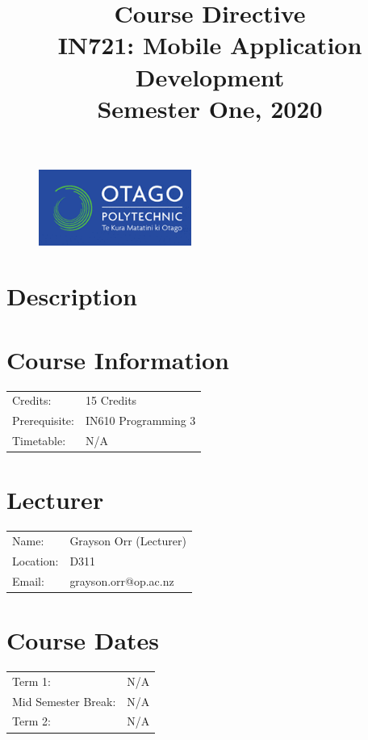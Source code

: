 \documentclass{article}
\author{}
\begin{document}
\begin{figure}
  \includegraphics[width=50mm]{../../resources/img/logo.png}
\end{figure}

\title{Course Directive\\IN721: Mobile Application Development\\Semester One, 2020}
\date{}
\maketitle

\section*{Description}

\section*{Course Information}
\begin{tabular}{ll}
  Credits:      & 15 Credits          \\
  Prerequisite: & IN610 Programming 3 \\
  Timetable:    & N/A                 \\
\end{tabular}

\section*{Lecturer}
\begin{tabular}{ll}
  Name:     & Grayson Orr (Lecturer) \\
  Location: & D311                   \\
  Email:    & grayson.orr@op.ac.nz   \\
\end{tabular}

\section*{Course Dates}
\begin{tabular}{ll}
  Term 1:             & N/A \\
  Mid Semester Break: & N/A \\
  Term 2:             & N/A \\
\end{tabular}
\end{document}
